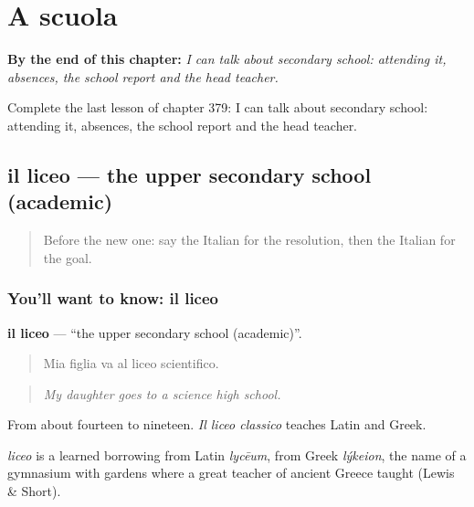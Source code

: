 
\chapter{A scuola}
\label{ch:it-a-scuola}

\begin{chapteropening}
\textbf{By the end of this chapter:} \emph{I can talk about secondary school: attending it, absences, the school report and the head teacher.}

Complete the last lesson of chapter 379: I can talk about secondary school: attending it, absences, the school report and the head teacher.
\end{chapteropening}

\section[il liceo]{il liceo — the upper secondary school (academic)}

\label{lesson:IT-C379-liceo}



\begin{quote}
Before the new one: say the Italian for the resolution, then the Italian for the goal.
\end{quote}

\subsection*{You'll want to know: il liceo}
\textbf{il liceo} — \textquotedblleft{}the upper secondary school (academic)\textquotedblright{}.

\begin{quote}
Mia figlia va al liceo scientifico.
\end{quote}

\begin{quote}
\emph{My daughter goes to a science high school.}
\end{quote}

From about fourteen to nineteen. \emph{Il liceo classico} teaches Latin and Greek.

\begin{cousinweb}
\emph{liceo} is a learned borrowing from Latin \emph{lycēum}, from Greek \emph{lýkeion}, the name of a gymnasium with gardens where a great teacher of ancient Greece taught (Lewis \& Short).
\end{cousinweb}

